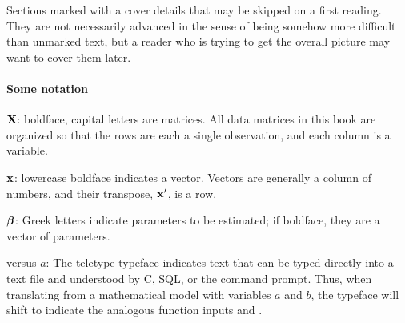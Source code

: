 Sections marked with a \ind{\treesymbol} cover details that may be
skipped on a first reading. They are not necessarily advanced
in the sense of being somehow more difficult than unmarked text, but a
reader who is trying to get the overall picture may want to cover them 
later. 

\paragraph{Some notation}  \hfill

${\bf X}$: boldface, capital letters are matrices. All data matrices in this
book are organized so that the rows are each a single observation, and
each column is a variable.

${\bf x}$: lowercase boldface indicates a vector. Vectors are generally a
column of numbers, and their transpose, ${\bf x}'$, is a row.

${\mbox{\boldmath$\beta$}}$: Greek letters indicate parameters to be estimated;
if boldface, they are a vector of parameters.

 versus $a$: The teletype typeface indicates text
that can be typed directly into a text file and understood by C, SQL, or
the command prompt. Thus, when translating from a mathematical model
with variables $a$ and $b$, the typeface will shift to indicate the
analogous function inputs  and .











